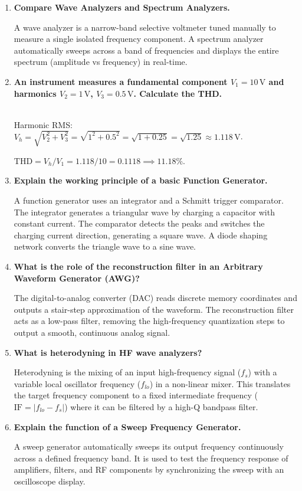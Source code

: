 \documentclass[12pt,a4paper]{article}
\newcommand{\Q}[1]{\textbf{#1}\par\noindent\ignorespaces}
\begin{document}
\begin{tcolorbox}[exambox, title={\textbf{Frequently Asked / Viva Questions}}]
\begin{enumerate}[topsep=0pt, label=\textbf{Q\arabic*.}, itemsep=5pt]
  \item \Q{Compare Wave Analyzers and Spectrum Analyzers.}
    A wave analyzer is a narrow-band selective voltmeter tuned manually to measure a single isolated frequency component. A spectrum analyzer automatically sweeps across a band of frequencies and displays the entire spectrum (amplitude vs frequency) in real-time.
  \item \Q{An instrument measures a fundamental component $V_1 = 10\,\text{V}$ and harmonics $V_2 = 1\,\text{V}$, $V_3 = 0.5\,\text{V}$. Calculate the THD.}\\
    Harmonic RMS: $V_h = \sqrt{V_2^2 + V_3^2} = \sqrt{1^2 + 0.5^2} = \sqrt{1 + 0.25} = \sqrt{1.25} \approx 1.118\,\text{V}$.\par
    $\text{THD} = V_h / V_1 = 1.118 / 10 = 0.1118 \implies 11.18\%$.
  \item \Q{Explain the working principle of a basic Function Generator.}
    A function generator uses an integrator and a Schmitt trigger comparator. The integrator generates a triangular wave by charging a capacitor with constant current. The comparator detects the peaks and switches the charging current direction, generating a square wave. A diode shaping network converts the triangle wave to a sine wave.
  \item \Q{What is the role of the reconstruction filter in an Arbitrary Waveform Generator (AWG)?}
    The digital-to-analog converter (DAC) reads discrete memory coordinates and outputs a stair-step approximation of the waveform. The reconstruction filter acts as a low-pass filter, removing the high-frequency quantization steps to output a smooth, continuous analog signal.
  \item \Q{What is heterodyning in HF wave analyzers?}
    Heterodyning is the mixing of an input high-frequency signal ($f_s$) with a variable local oscillator frequency ($f_{lo}$) in a non-linear mixer. This translates the target frequency component to a fixed intermediate frequency ($\text{IF} = |f_{lo} - f_s|$) where it can be filtered by a high-Q bandpass filter.
  \item \Q{Explain the function of a Sweep Frequency Generator.}
    A sweep generator automatically sweeps its output frequency continuously across a defined frequency band. It is used to test the frequency response of amplifiers, filters, and RF components by synchronizing the sweep with an oscilloscope display.

\end{enumerate}
\end{tcolorbox}
\end{document}
